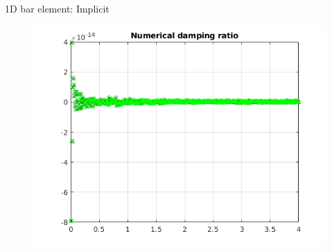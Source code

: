 \begin{frame}{1D bar element: Implicit}
\begin{figure}[ht]
\begin{minipage}[b]{0.5\linewidth}
  \end{minipage}%
  \begin{minipage}[b]{0.5\linewidth}
    \centering
    \includegraphics[scale=.35]{images/bar-imp-4.png} \\

  \end{minipage} 
\end{figure}
\end{frame}

